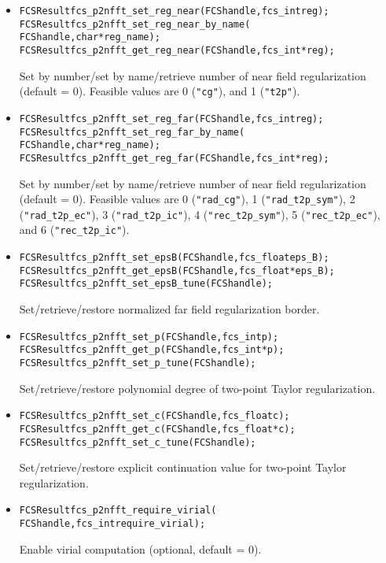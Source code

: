 \begin{itemize}
  \item
\begin{alltt}
FCSResult fcs_p2nfft_set_reg_near(FCS handle, fcs_int reg);
FCSResult fcs_p2nfft_set_reg_near_by_name(
    FCS handle, char* reg_name);
FCSResult fcs_p2nfft_get_reg_near(FCS handle, fcs_int* reg);
\end{alltt}
    Set by number/set by name/retrieve number of near field regularization (default = 0).
    Feasible values are
    0 (\verb!"cg"!), and
    1 (\verb!"t2p"!).
  \item
\begin{alltt}
FCSResult fcs_p2nfft_set_reg_far(FCS handle, fcs_int reg);
FCSResult fcs_p2nfft_set_reg_far_by_name(
    FCS handle, char* reg_name);
FCSResult fcs_p2nfft_get_reg_far(FCS handle, fcs_int* reg);
\end{alltt}
    Set by number/set by name/retrieve number of near field regularization (default = 0).
    Feasible values are
    0 (\verb!"rad_cg"!),
    1 (\verb!"rad_t2p_sym"!),
    2 (\verb!"rad_t2p_ec"!),
    3 (\verb!"rad_t2p_ic"!),
    4 (\verb!"rec_t2p_sym"!),
    5 (\verb!"rec_t2p_ec"!), and 
    6 (\verb!"rec_t2p_ic"!).
  \item
\begin{alltt}
FCSResult fcs_p2nfft_set_epsB(FCS handle, fcs_float eps_B);
FCSResult fcs_p2nfft_get_epsB(FCS handle, fcs_float* eps_B);
FCSResult fcs_p2nfft_set_epsB_tune(FCS handle);
\end{alltt}
    Set/retrieve/restore normalized far field regularization border.
  \item
\begin{alltt}
FCSResult fcs_p2nfft_set_p(FCS handle, fcs_int p);
FCSResult fcs_p2nfft_get_p(FCS handle, fcs_int* p);
FCSResult fcs_p2nfft_set_p_tune(FCS handle);
\end{alltt}
    Set/retrieve/restore polynomial degree of two-point Taylor regularization.
  \item
\begin{alltt}
FCSResult fcs_p2nfft_set_c(FCS handle, fcs_float c);
FCSResult fcs_p2nfft_get_c(FCS handle, fcs_float* c);
FCSResult fcs_p2nfft_set_c_tune(FCS handle);
\end{alltt}
    Set/retrieve/restore explicit continuation value for two-point Taylor regularization.
  \item
\begin{alltt}
FCSResult fcs_p2nfft_require_virial(
    FCS handle, fcs_int require_virial);
\end{alltt}
    Enable virial computation (optional, default = 0).

\end{itemize}
